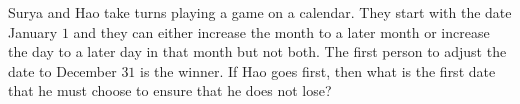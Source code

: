 Surya and Hao take turns playing a game on a calendar. They start with the date January $1$ and they can either increase the month to a later month or increase the day to a later day in that month but not both. The first person to adjust the date to December $31$ is the winner. If Hao goes first, then what is the first date that he must choose to ensure that he does not lose?
